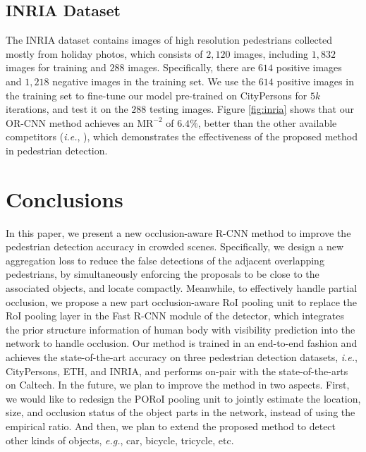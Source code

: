 \documentclass[runningheads]{llncs}
\def\ie{{\em i.e.}}
\def\eg{{\em e.g.}}
\begin{document}
\subsection{INRIA Dataset}
The INRIA dataset \cite{DBLP:conf/cvpr/DalalT05} contains images of high resolution pedestrians collected mostly from holiday photos, which consists of $2,120$ images, including $1,832$ images for training and $288$ images. Specifically, there are $614$ positive images and $1,218$ negative images in the training set. We use the $614$ positive images in the training set to fine-tune our model pre-trained on CityPersons for $5k$ iterations, and test it on the $288$ testing images. Figure \ref{fig:inria} shows that our OR-CNN method achieves an $\text{MR}^{-2}$ of $6.4\%$, better than the other available competitors (\ie, \cite{DBLP:conf/cvpr/DalalT05,DBLP:journals/ijcv/ViolaJ04,DBLP:conf/cvpr/BenensonMTG13,DBLP:conf/cvpr/ZhangBC14,DBLP:conf/eccv/PaisitkriangkraiSH14,DBLP:conf/eccv/ZhangLLH16,DBLP:conf/iccv/MathiasBTG13,DBLP:conf/iccv/MarinVLAL13,DBLP:conf/nips/NamDH14,DBLP:conf/cvpr/LimZD13,DBLP:conf/bmvc/YangWW15,DBLP:conf/bmvc/TocaCP15,DBLP:conf/cvpr/CosteaN14,DBLP:conf/cvpr/BenensonMTG12}), which demonstrates the effectiveness of the proposed method in pedestrian detection.


\section{Conclusions}
In this paper, we present a new occlusion-aware R-CNN method to improve the pedestrian detection accuracy in crowded scenes. Specifically, we design a new aggregation loss to reduce the false detections of the adjacent overlapping pedestrians, by simultaneously enforcing the proposals to be close to the associated objects, and locate compactly. Meanwhile, to effectively handle partial occlusion, we propose a new part occlusion-aware RoI pooling unit to replace the RoI pooling layer in the Fast R-CNN module of the detector, which integrates the prior structure information of human body with visibility prediction into the network to handle occlusion. Our method is trained in an end-to-end fashion and achieves the state-of-the-art accuracy on three pedestrian detection datasets, \ie, CityPersons, ETH, and INRIA, and performs on-pair with the state-of-the-arts on Caltech. In the future, we plan to improve the method in two aspects. First, we would like to redesign the PORoI pooling unit to jointly estimate the location, size, and occlusion status of the object parts in the network, instead of using the empirical ratio. And then, we plan to extend the proposed method to detect other kinds of objects, \eg, car, bicycle, tricycle, etc.
\end{document}
